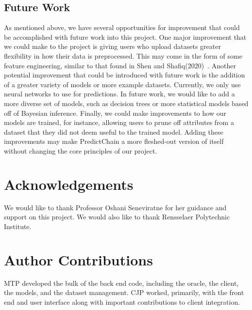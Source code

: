 \documentclass{ledger}
\begin{document}
\subsection{Future Work}

As mentioned above, we have several opportunities for improvement that could be accomplished with future work
into this project.  One major improvement that we could make to the project is giving users who upload datasets greater
flexibility in how their data is preprocessed.  This may come in the form of some feature engineering, similar to
that found in Shen and Shafiq(2020)~\cite{deepPrediction}.  Another potential improvement that could be introduced with future work is
the addition of a greater variety of models or more example datasets.  Currently, we only use neural networks to
use for predictions.  In future work, we would like to add a more diverse set of models, such as decision trees or
more statistical models based off of Bayesian inference.  Finally, we could make improvements to how our models are
trained, for instance, allowing users to prune off attributes from a dataset that they did not deem useful to the
trained model.  Adding these improvements may make PredictChain a more fleshed-out version of itself without changing
the core principles of our project.

\ledgernotes

\section*{Acknowledgements} 

We would like to thank Professor Oshani Seneviratne for her guidance and support on this project.
We would also like to thank Rensselaer Polytechnic Institute.

\section*{Author Contributions}

MTP developed the bulk of the back end code, including the oracle, the client, the models, and the dataset management.
CJP worked, primarily, with the front end and user interface along with important contributions to client integration.



\end{document}
